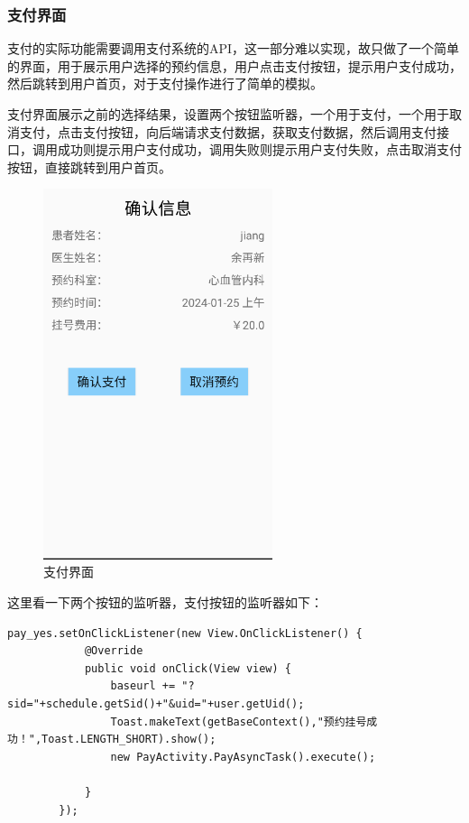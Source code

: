 \documentclass[UTF8,12pt]{article}
\begin{document}
\newpage

\subsubsection{支付界面}
支付的实际功能需要调用支付系统的API，这一部分难以实现，故只做了一个简单的界面，用于展示用户选择的预约信息，用户点击支付按钮，提示用户支付成功，然后跳转到用户首页，对于支付操作进行了简单的模拟。

支付界面展示之前的选择结果，设置两个按钮监听器，一个用于支付，一个用于取消支付，点击支付按钮，向后端请求支付数据，获取支付数据，然后调用支付接口，调用成功则提示用户支付成功，调用失败则提示用户支付失败，点击取消支付按钮，直接跳转到用户首页。

\begin{figure}[htbp]
    \centering
    \includegraphics[width=0.6\textwidth]{imgs/25.png}
    \caption{支付界面}
\end{figure}

这里看一下两个按钮的监听器，支付按钮的监听器如下：

\begin{lstlisting}[frame=shadowbox]
    pay_yes.setOnClickListener(new View.OnClickListener() {
            @Override
            public void onClick(View view) {
                baseurl += "?sid="+schedule.getSid()+"&uid="+user.getUid();
                Toast.makeText(getBaseContext(),"预约挂号成功！",Toast.LENGTH_SHORT).show();
                new PayActivity.PayAsyncTask().execute();

            }
        });
\end{lstlisting}
\end{document}
